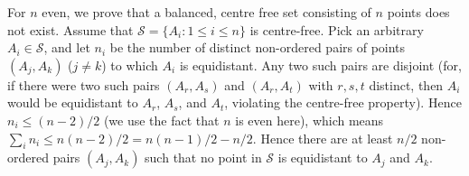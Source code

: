 \begin{problem}
For $n$ even, we prove that a balanced, centre free set consisting of $n$ points does not exist. Assume that $\mathcal{S}=\{A_i: 1\leq i \leq n\}$ is centre-free. Pick an arbitrary $A_i \in \mathcal{S}$, and let $n_i$ be the number of distinct non-ordered pairs of points $(A_j,A_k)$ ($j\neq k$) to which $A_i$ is equidistant. Any two such pairs are disjoint (for, if there were two such pairs $(A_r,A_s)$ and $(A_r, A_t)$ with $r, s, t$ distinct, then $A_i$ would be equidistant to $A_r$, $A_s$, and $A_t$, violating the centre-free property). Hence $n_i \leq (n-2)/2$ (we use the fact that $n$ is even here), which means $\sum_i n_i \leq n(n-2)/2 = n(n-1)/2 -n/2$. Hence there are at least $n/2$ non-ordered pairs $(A_j, A_k)$ such that no point in $\mathcal{S}$ is equidistant to $A_j$ and $A_k$.

\end{problem}

%

